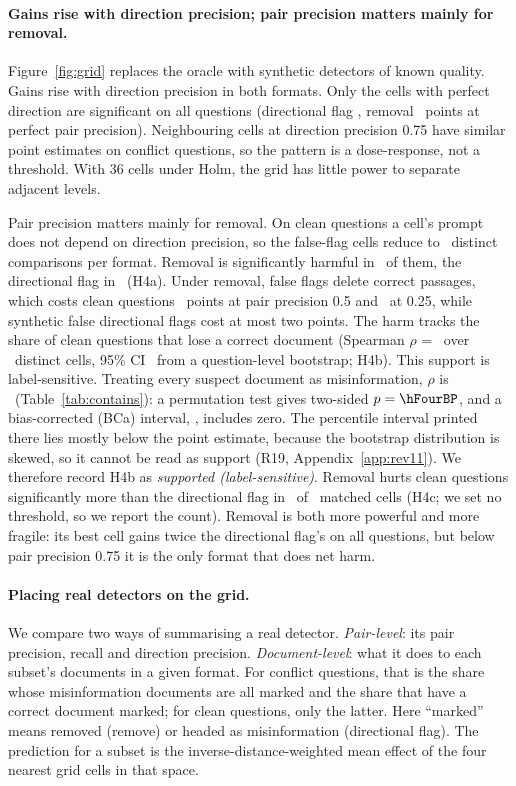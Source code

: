 \paragraph{Gains rise with direction precision; pair precision matters mainly for removal.}
Figure~\ref{fig:grid} replaces the oracle with synthetic detectors of known quality. Gains rise with direction
precision in both formats. Only the cells with perfect direction are significant on all questions (directional flag
\gDirOneDOneAll, removal \gRemOneDOneAll\ points at perfect pair precision). Neighbouring cells at direction precision
0.75 have similar point estimates on conflict questions, so the pattern is a dose-response, not a threshold. With 36 cells
under Holm, the grid has little power to separate adjacent levels.

Pair precision matters mainly for removal. On clean questions a cell's prompt does not depend
on direction precision, so the false-flag cells reduce to \hFourRemN\ distinct comparisons per format. Removal is
significantly harmful in \hFourRemHarm\ of them, the directional flag in \hFourDirHarm\ (H4a). Under removal, false flags
delete correct passages, which costs clean questions \agRemHalfDOneClean\ points at pair precision 0.5 and
\agRemQuDOneClean\ at 0.25, while synthetic false directional flags cost at most two points. The harm tracks the
share of clean questions that lose a correct document (Spearman $\rho$ = \hFourRho\ over \hFourRhoCells\ distinct
cells, 95\% CI \hFourRhoCI\ from a question-level bootstrap; H4b). This support is label-sensitive. Treating every
suspect document as misinformation, $\rho$ is \hFourBRho\ (Table~\ref{tab:contains}): a permutation test gives
two-sided $p=\hFourBP$, and a bias-corrected (BCa) interval, \hFourBBcaCI, includes zero. The percentile interval
printed there lies mostly below the point estimate, because the bootstrap distribution is skewed, so it cannot be
read as support (R19, Appendix~\ref{app:rev11}). We therefore record H4b as \emph{supported (label-sensitive)}.
Removal hurts clean questions significantly more than the directional flag in \hFourRemWorse\ of \hFourMatched\
matched cells (H4c; we set no threshold, so we report the count). Removal is both more powerful and more fragile:
its best cell gains twice the directional flag's on all questions, but below pair precision 0.75 it is the only
format that does net harm.


\paragraph{Placing real detectors on the grid.}
We compare two ways of summarising a real
detector. \emph{Pair-level}: its pair precision, recall and direction precision. \emph{Document-level}: what it does
to each subset's documents in a given format. For conflict questions, that is the share whose misinformation documents
are all marked and the share that have a correct document marked; for clean questions, only the latter. Here ``marked'' means removed (remove) or headed as misinformation (directional flag). The prediction
for a subset is the inverse-distance-weighted mean effect of the four nearest grid cells in that space.

